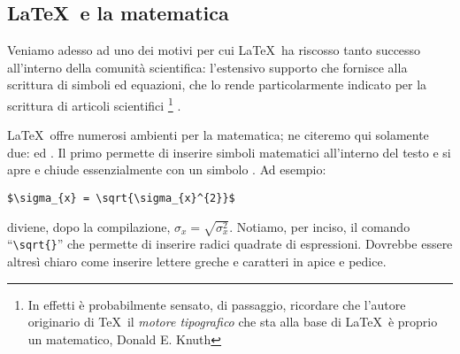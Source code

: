 \subsection{\LaTeX\ e la matematica}

Veniamo adesso ad uno dei motivi per cui \LaTeX\ ha riscosso tanto successo
all'interno della comunit\`a scientifica: l'estensivo supporto che fornisce
alla scrittura di simboli ed equazioni, che lo rende particolarmente indicato
per la scrittura di articoli scientifici%
\footnote{
In effetti \`e probabilmente sensato, di passaggio, ricordare che l'autore
originario di \TeX\, il \emph{motore tipografico} che sta alla base di \LaTeX\
\`e proprio un matematico, Donald E. Knuth}%
.

\LaTeX\ offre numerosi ambienti per la matematica; ne citeremo qui solamente
due: \cchar{math} ed \cchar{equation}. Il primo permette di inserire simboli
matematici all'interno del testo e si apre e chiude essenzialmente con un
simbolo \cchar{\$}. Ad esempio:
\begin{verbatim}
$\sigma_{x} = \sqrt{\sigma_{x}^{2}}$
\end{verbatim}
diviene, dopo la compilazione, $\sigma_{x} = \sqrt{\sigma_{x}^{2}}$.
Notiamo, per inciso, il comando ``\verb|\sqrt{}|'' che permette di inserire
radici quadrate di espressioni. Dovrebbe essere altres\`i chiaro
come inserire lettere greche e caratteri in apice e pedice.


